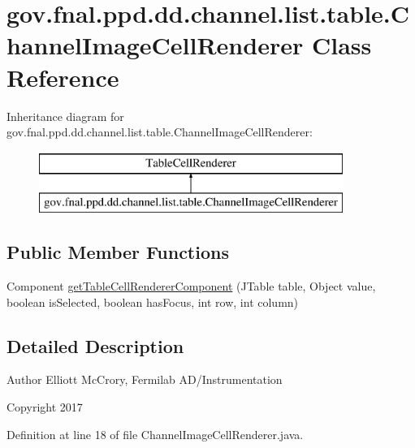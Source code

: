 \hypertarget{classgov_1_1fnal_1_1ppd_1_1dd_1_1channel_1_1list_1_1table_1_1ChannelImageCellRenderer}{\section{gov.\-fnal.\-ppd.\-dd.\-channel.\-list.\-table.\-Channel\-Image\-Cell\-Renderer Class Reference}
\label{classgov_1_1fnal_1_1ppd_1_1dd_1_1channel_1_1list_1_1table_1_1ChannelImageCellRenderer}
}
Inheritance diagram for gov.\-fnal.\-ppd.\-dd.\-channel.\-list.\-table.\-Channel\-Image\-Cell\-Renderer\-:\begin{figure}[H]
\begin{center}
\leavevmode
\includegraphics[height=2.000000cm]{classgov_1_1fnal_1_1ppd_1_1dd_1_1channel_1_1list_1_1table_1_1ChannelImageCellRenderer}
\end{center}
\end{figure}
\subsection*{Public Member Functions}
\begin{DoxyCompactItemize}
\item 
Component \hyperlink{classgov_1_1fnal_1_1ppd_1_1dd_1_1channel_1_1list_1_1table_1_1ChannelImageCellRenderer_a9f7de2d0208d162c90d95e071c1718b0}{get\-Table\-Cell\-Renderer\-Component} (J\-Table table, Object value, boolean is\-Selected, boolean has\-Focus, int row, int column)
\end{DoxyCompactItemize}


\subsection{Detailed Description}
\begin{DoxyAuthor}{Author}
Elliott Mc\-Crory, Fermilab A\-D/\-Instrumentation 
\end{DoxyAuthor}
\begin{DoxyCopyright}{Copyright}
2017 
\end{DoxyCopyright}


Definition at line 18 of file Channel\-Image\-Cell\-Renderer.\-java.




